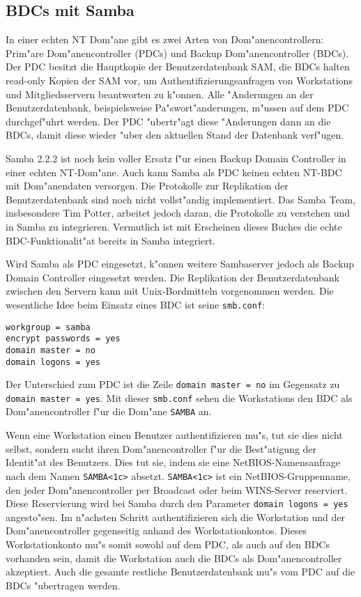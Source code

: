 \documentclass{scrartcl}\usepackage{pslatex}\typearea{12}
\newcommand{\param}{\texttt}
\newcommand{\dateistyle}{\texttt}
\newcommand{\nbname}{\texttt}
\newcommand{\todo}[1]{}
\begin{document}
\subsection{BDCs mit Samba}

In einer echten NT Dom"ane gibt es zwei Arten von Dom"anencontrollern:
Prim"are Dom"anencontroller (PDCs) und Backup Dom"anencontroller
(BDCs). Der PDC besitzt die Hauptkopie der Benutzerdatenbank
SAM\todo{uebersetzung}, die BDCs halten read-only Kopien der SAM vor,
um Authentifizierungsanfragen von Workstations und Mitgliedsservern
beantworten zu k"onnen. Alle "Anderungen an der Benutzerdatenbank,
beispielsweise Pa"swort"anderungen, m"ussen auf dem PDC durchgef"uhrt
werden. Der PDC "ubertr"agt diese "Anderungen dann an die BDCs, damit
diese wieder "uber den aktuellen Stand der Datenbank verf"ugen.

Samba 2.2.2 ist noch kein voller Ersatz f"ur einen Backup Domain
Controller in einer echten NT-Dom"ane. Auch kann Samba als PDC keinen
echten NT-BDC mit Dom"anendaten versorgen. Die Protokolle zur
Replikation der Benutzerdatenbank sind noch nicht vollst"andig
implementiert. Das Samba Team, insbesondere Tim Potter, arbeitet
jedoch daran, die Protokolle zu verstehen und in Samba zu integrieren.
Vermutlich ist mit Erscheinen dieses Buches die echte
BDC-Funktionalit"at bereits in Samba integriert.

Wird Samba als PDC eingesetzt, k"onnen weitere Sambaserver jedoch als
Backup Domain Controller eingesetzt werden. Die Replikation der
Benutzerdatenbank zwischen den Servern kann mit Unix-Bordmitteln
vorgenommen werden. Die wesentliche Idee beim Einsatz eines BDC ist
seine \dateistyle{smb.conf}:

\begin{verbatim}
workgroup = samba
encrypt passwords = yes
domain master = no
domain logons = yes
\end{verbatim}

Der Unterschied zum PDC ist die Zeile \param{domain master = no} im
Gegensatz zu \param{domain master = yes}. Mit dieser
\dateistyle{smb.conf} sehen die Workstations den BDC als
Dom"anencontroller f"ur die Dom"ane \nbname{SAMBA} an.

Wenn eine Workstation einen Benutzer authentifizieren mu"s, tut sie
dies nicht selbst, sondern sucht ihren Dom"anencontroller f"ur die
Best"atigung der Identit"at des Benutzers. Dies tut sie, indem sie
eine NetBIOS-Namensanfrage nach dem Namen \nbname{SAMBA<1c>} absetzt.
\nbname{SAMBA<1c>} ist ein NetBIOS-Gruppenname, den jeder
Dom"anencontroller per Broadcast oder beim WINS-Server reserviert.
Diese Reservierung wird bei Samba durch den Parameter \nbname{domain
  logons = yes} angesto"sen. Im n"achsten Schritt authentifizieren
sich die Workstation und der Dom"anencontroller gegenseitig anhand des
Workstationkontos. Dieses Workstationkonto mu"s somit sowohl auf dem
PDC, als auch auf den BDCs vorhanden sein, damit die Workstation auch
die BDCs als Dom"anencontroller akzeptiert. Auch die gesamte restliche
Benutzerdatenbank mu"s vom PDC auf die BDCs "ubertragen werden.
\end{document}
